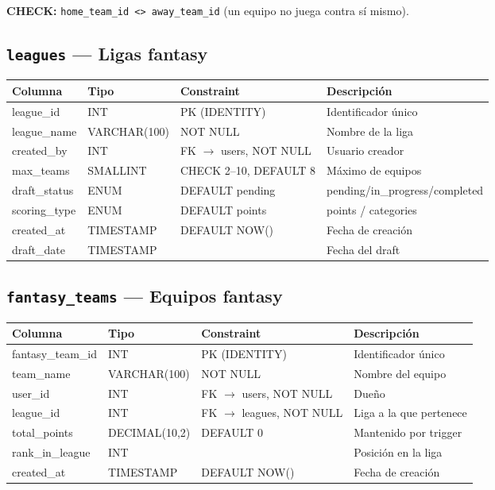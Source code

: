 \documentclass[12pt,a4paper]{article}
\begin{document}
\textbf{CHECK:} \texttt{home\_team\_id <> away\_team\_id} (un equipo no juega contra s\'i mismo).

\subsection{\texttt{leagues} --- Ligas fantasy}
\begin{tabular}{>{\ttfamily\small}l l l p{5cm}}
\toprule
\normalfont\textbf{Columna} & \textbf{Tipo} & \textbf{Constraint} & \textbf{Descripci\'on} \\
\midrule
league\_id & INT & PK (IDENTITY) & Identificador \'unico \\
league\_name & VARCHAR(100) & NOT NULL & Nombre de la liga \\
created\_by & INT & FK $\to$ users, NOT NULL & Usuario creador \\
max\_teams & SMALLINT & CHECK 2--10, DEFAULT 8 & M\'aximo de equipos \\
draft\_status & ENUM & DEFAULT pending & pending/in\_progress/completed \\
scoring\_type & ENUM & DEFAULT points & points / categories \\
created\_at & TIMESTAMP & DEFAULT NOW() & Fecha de creaci\'on \\
draft\_date & TIMESTAMP & & Fecha del draft \\
\bottomrule
\end{tabular}

\subsection{\texttt{fantasy\_teams} --- Equipos fantasy}
\begin{tabular}{>{\ttfamily\small}l l l p{4.5cm}}
\toprule
\normalfont\textbf{Columna} & \textbf{Tipo} & \textbf{Constraint} & \textbf{Descripci\'on} \\
\midrule
fantasy\_team\_id & INT & PK (IDENTITY) & Identificador \'unico \\
team\_name & VARCHAR(100) & NOT NULL & Nombre del equipo \\
user\_id & INT & FK $\to$ users, NOT NULL & Due\~no \\
league\_id & INT & FK $\to$ leagues, NOT NULL & Liga a la que pertenece \\
total\_points & DECIMAL(10,2) & DEFAULT 0 & Mantenido por trigger \\
rank\_in\_league & INT & & Posici\'on en la liga \\
created\_at & TIMESTAMP & DEFAULT NOW() & Fecha de creaci\'on \\
\bottomrule
\end{tabular}
\end{document}
